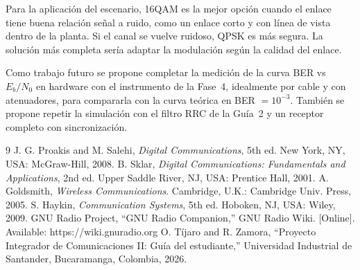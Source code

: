 \documentclass[10pt,twocolumn,letterpaper]{article}
\begin{document}
Para la aplicación del escenario, 16QAM es la mejor opción cuando el enlace tiene buena relación señal a ruido, como un enlace corto y con línea de vista dentro de la planta. Si el canal se vuelve ruidoso, QPSK es más segura. La solución más completa sería adaptar la modulación según la calidad del enlace.

Como trabajo futuro se propone completar la medición de la curva BER vs $E_b/N_0$ en hardware con el instrumento de la Fase~4, idealmente por cable y con atenuadores, para compararla con la curva teórica en BER $=10^{-3}$. También se propone repetir la simulación con el filtro RRC de la Guía~2 y un receptor completo con sincronización.

\begin{thebibliography}{9}
\footnotesize
{} J. G. Proakis and M. Salehi, \emph{Digital Communications}, 5th ed. New York, NY, USA: McGraw-Hill, 2008.
 B. Sklar, \emph{Digital Communications: Fundamentals and Applications}, 2nd ed. Upper Saddle River, NJ, USA: Prentice Hall, 2001.
 A. Goldsmith, \emph{Wireless Communications}. Cambridge, U.K.: Cambridge Univ. Press, 2005.
 S. Haykin, \emph{Communication Systems}, 5th ed. Hoboken, NJ, USA: Wiley, 2009.
 GNU Radio Project, ``GNU Radio Companion,'' GNU Radio Wiki. [Online]. Available: https://wiki.gnuradio.org
 O. Tíjaro and R. Zamora, ``Proyecto Integrador de Comunicaciones II: Guía del estudiante,'' Universidad Industrial de Santander, Bucaramanga, Colombia, 2026.
\end{thebibliography}
\end{document}
